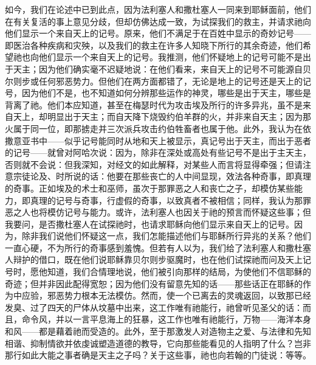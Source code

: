 如今，我们在论述中已到此点，因为法利塞人和撒杜塞人一同来到耶稣面前，他们在有关复活的事上意见分歧，但却仿佛达成一致，为试探我们的救主，并请求祂向他们显示一个来自天上的记号。原来，他们不满足于在百姓中显示的奇妙记号——即医治各种疾病和灾殃，以及我们的救主在许多人知晓下所行的其余奇迹，他们希望祂也向他们显示一个来自天上的记号。我推测，他们怀疑地上的记号可能不是出于天主；因为他们确实毫不迟疑地说：在他们看来，来自天上的记号不可能源自贝尔则步或任何邪恶势力。但他们在两方面都错了，无论是地上的记号还是天上的记号，因为他们不是，也不知道如何分辨那些运作的神灵，哪些是出于天主，哪些是背离了祂。他们本应知道，甚至在梅瑟时代为攻击埃及所行的许多异兆，虽不是来自天上，却明显出于天主；而自天降下烧毁约伯羊群的火，并非来自天主；因为那火属于同一位，即那掳走并三次派兵攻击约伯牲畜者也属于他。此外，我认为在依撒意亚书中——似乎记号能同时从地和天上被显示，真记号出于天主，而出于恶者的记号——就曾对阿哈次说：因为，除非在深处或高处有些记号不是出于主天主，否则就不会说：但我深知，对经文的如此解释，对某些人而言将显得牵强；但请注意宗徒论及、时所说的话：他要在那些丧亡的人中间显现，效法各种奇事，即真理的奇事。正如埃及的术士和巫师，虽次于那罪恶之人和丧亡之子，却模仿某些能力，即真理的记号与奇事，行虚假的奇事，以致真者不被相信；同样，我认为那罪恶之人也将模仿记号与能力。或许，法利塞人也因关于祂的预言而怀疑这些事；但我要问，是否撒杜塞人在试探祂时，也请求耶稣向他们显示来自天上的记号。因为，除非我们说他们怀疑这一点，我们怎能描述他们与耶稣所行异兆的关系？他们一直心硬，不为所行的奇事感到羞愧。但若有人以为，我们给了法利塞人和撒杜塞人辩护的借口，既在他们说耶稣靠贝尔则步驱魔时，也在他们试探祂而问及天上记号时，愿他知道，我们合情理地说，他们被引向那样的结局，为使他们不信耶稣的奇迹；但并非因此配得宽恕；因为他们没有留意先知的话——那些话正在耶稣的作为中应验，邪恶势力根本无法模仿。然而，使一个已离去的灵魂返回，以致那已经发臭、过了四天的尸体从坟墓中出来，这工作唯有祂能行，祂曾听见圣父的话：而且，命令风，并以一言平息海上的狂暴，这工作也唯有祂能行，万物——海洋本身和风——都是藉着祂而受造的。此外，至于那激发人对造物主之爱、与法律和先知相谐、抑制情欲并依虔诚塑造道德的教导，它向那些能看见的人指明了什么？岂非那行如此大能之事者确是天主之子吗？关于这些事，祂也向若翰的门徒说：等等。\par

